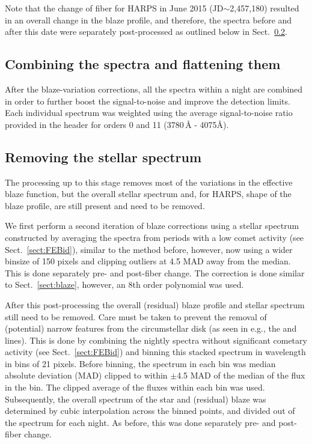 \documentclass{aa}
\begin{document}
Note that the change of fiber for HARPS in June 2015 (JD$\sim$2,457,180) resulted in an overall change in the blaze profile, and therefore, the spectra before and after this date were separately post-processed as outlined below in Sect.~\ref{sect:starcor}.

\subsection{Combining the spectra and flattening them}\label{sect:comb}

After the blaze-variation corrections, all the spectra within a night are combined in order to further boost the signal-to-noise and improve the detection limits.
%
Each individual spectrum was weighted using the average signal-to-noise ratio provided in the header for orders 0 and 11 (3780\,\AA{} - 4075\AA).%

\subsection{Removing the stellar spectrum}\label{sect:starcor}
The processing up to this stage removes most of the variations in the effective blaze function, but the overall stellar spectrum and, for HARPS, shape of the blaze profile, are still present and need to be removed. 

We first perform a second iteration of blaze corrections using a stellar spectrum constructed by averaging the spectra from periods with a low comet activity (see Sect.~\ref{sect:FEBid}), similar to the method before, however, now using a wider binsize of 150 pixels and clipping outliers at 4.5 MAD away from the median.
%
This is done separately pre- and post-fiber change. The correction is done similar to Sect.~\ref{sect:blaze}, however, an 8th order polynomial was used.

After this post-processing the overall (residual) blaze profile and stellar spectrum still need to be removed.
%
Care must be taken to prevent the removal of (potential) narrow features from the circumstellar disk (as seen in e.g., the  and  lines).
%
This is done by combining the nightly spectra without significant cometary activity (see Sect.~\ref{sect:FEBid}) and binning this stacked spectrum in wavelength in bins of 21 pixels.
%
Before binning, the spectrum in each bin was median absolute deviation (MAD) clipped to within $\pm$4.5 MAD of the median of the flux in the bin.
%
The clipped average of the fluxes within each bin was used.
%
Subsequently, the overall spectrum of the star and (residual) blaze was determined by cubic interpolation across the binned points, and divided out of the spectrum for each night.
%
As before, this was done separately pre- and post-fiber change.
\end{document}
